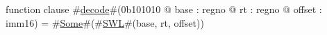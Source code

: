 function clause #\hyperref[zdecode]{decode}#(0b101010 @ base : regno @ rt : regno @ offset : imm16) =
      #\hyperref[zSome]{Some}#(#\hyperref[zSWL]{SWL}#(base, rt, offset))
